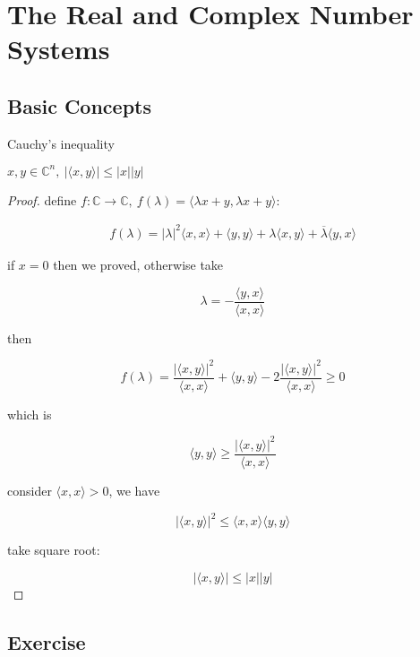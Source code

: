 \section{The Real and Complex Number Systems}

\subsection{Basic Concepts}

\begin{thm}
Cauchy's inequality

$x,y \in \mathbb{C}^n,\: \lvert \langle x,y\rangle \rvert \le \lvert x \rvert \lvert y \rvert$
\end{thm}

\begin{proof}
    define $f: \mathbb{C} \to \mathbb{C},\: f(\lambda) = \langle \lambda x + y, \lambda x + y \rangle$:

    \begin{align*}
        f(\lambda) =\lvert\lambda \rvert^2 \langle x, x \rangle +  \langle y, y \rangle + \lambda  \langle x,y \rangle +  \overline{\lambda}  \langle y,x \rangle
    \end{align*}

    if $x=0$ then we proved, otherwise take 

    \[
        \lambda = -\frac{\langle y,x \rangle}{\langle x, x \rangle}
    \]

    then

    \[
        f(\lambda) = \frac{\lvert \langle x, y \rangle \rvert^2}{\langle x, x \rangle} + \langle y, y \rangle - 2 \frac{\lvert \langle x,y \rangle \rvert^2}{\langle x, x\rangle} \ge 0
    \]

    which is

    \[
        \langle y, y \rangle \ge \frac{\lvert \langle x, y \rangle \rvert^2}{\langle x, x \rangle}
    \]

    consider $\langle x, x \rangle > 0$, we have

    \[
 \lvert \langle x, y \rangle \rvert^2      \le \langle x, x \rangle \langle y, y \rangle
    \]

    take square root:

    \[
\lvert \langle x, y \rangle \rvert \le \lvert x \rvert \lvert y \rvert
    \]
\end{proof}

\subsection{Exercise}

